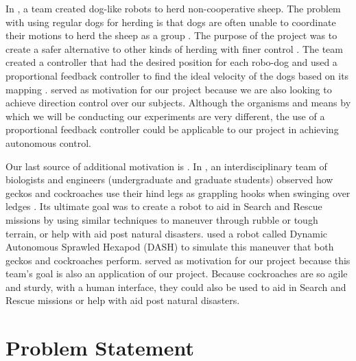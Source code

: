 \documentclass{article}
\begin{document}
\bigskip

In \cite{pierson2015bioinspired}%
, a team created dog-like robots to herd non-cooperative sheep. The problem with using regular dogs for herding is that dogs are often unable to coordinate their motions to herd the sheep as a group \cite{pierson2015bioinspired}. The purpose of the project was to create a safer alternative to other kinds of herding with finer control \cite{pierson2015bioinspired}. The team created a controller that had the desired position for each robo-dog and used a proportional feedback controller to find the ideal velocity of the dogs based on its mapping \cite{pierson2015bioinspired}. \cite{pierson2015bioinspired} served as motivation for our project because we are also looking to achieve direction control over our subjects. Although the organisms and means by which we will be conducting our experiments are very different, the use of a proportional feedback controller could be applicable to our project in achieving autonomous control. %

\bigskip

Our last source of additional motivation is \cite{mongeau2012rapid}. In \cite{mongeau2012rapid}, an interdisciplinary team of biologists and engineers (undergraduate and graduate students)  observed how geckos and cockroaches use their hind legs as grappling hooks when swinging over ledges \cite{mongeau2012rapid}. Its ultimate goal was to create a robot to aid in Search and Rescue missions by using similar techniques to maneuver through rubble or tough terrain, or help with aid post natural disasters. \cite{mongeau2012rapid} used  a robot called Dynamic Autonomous Sprawled Hexapod (DASH) to simulate this maneuver that both geckos and cockroaches perform. \cite{mongeau2012rapid} served as motivation for our project because this team's goal is also an application of our project. Because cockroaches are so agile and sturdy, with a human interface, they could also be used to aid in Search and Rescue missions or help with aid post natural disasters.%

\section{Problem Statement}
\end{document}
